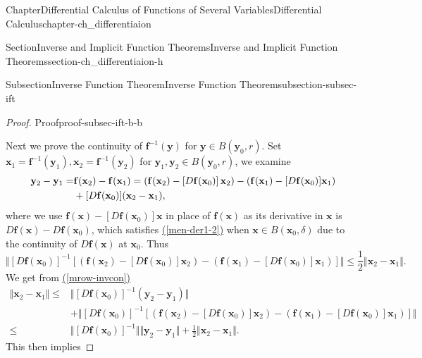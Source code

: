 \documentclass[oneside,10pt,]{book}
\newcommand{\xreffont}{\relax}
\numberwithin{equation}{section}
\newcommand{\bff}{\mathbf{f}}
\newcommand{\by}{\mathbf{y}}
\newcommand{\amp}{&}
\begin{document}
\begin{chapterptx}{Chapter}{Differential Calculus of Functions of Several Variables}{}{Differential Calculus}{}{}{chapter-ch_differentiaion}
\begin{sectionptx}{Section}{Inverse and Implicit Function Theorems}{}{Inverse and Implicit Function Theorems}{}{}{section-ch_differentiaion-h}
\begin{subsectionptx}{Subsection}{Inverse Function Theorem}{}{Inverse Function Theorem}{}{}{subsection-subsec-ift}
\begin{proof}{Proof}{}{proof-subsec-ift-b-b}
\par
Next we prove the continuity of \(\bff^{-1}(\by)\) for \(\by \in B({\mathbf y}_{0}, r)\). Set \({\mathbf x}_{1}=  {\mathbf f}^{-1} ({\mathbf y}_{1}),
{\mathbf x}_{2}=  {\mathbf f}^{-1} ({\mathbf y}_{2})\) for \({\mathbf y}_{1}, {\mathbf y}_{2}\in
B({\mathbf y}_{0}, r)\), we examine%
\begin{align}
{\mathbf y}_{2}- {\mathbf y}_{1}= \amp {\mathbf f}({\mathbf x}_2)- {\mathbf f}({\mathbf x}_1)
=\left( {\mathbf f}({\mathbf x}_2)- \left[D{\mathbf f}({\mathbf x}_{0})\right]{\mathbf x}_2 \right) - 
\left({\mathbf f}({\mathbf x}_1)- [D{\mathbf f}({\mathbf x}_{0})]{\mathbf x}_1\right) \notag\\
\amp + [D{\mathbf f}({\mathbf x}_{0})]({\mathbf x}_2 - {\mathbf x}_1),\label{mrow-invcon}
\end{align}
where we use \({\mathbf f}({\mathbf x})- [D{\mathbf f}({\mathbf x}_{0})]{\mathbf x}\) in place of \({\mathbf f}({\mathbf x})\) as its  derivative in \({\mathbf x}\) is \(D{\mathbf f}({\mathbf x})- D{\mathbf f}({\mathbf x}_{0})\), which satisfies \hyperref[men-der1-2]{({\xreffont\ref{men-der1-2}})} when \({\mathbf x}\in B({\mathbf x}_{0}, \delta)\) due to the continuity of \(D{\mathbf f}({\mathbf x})\) at \({\mathbf x}_{0}\).  Thus%
\begin{equation*}
\Vert \left[D{\mathbf f}({\mathbf x}_{0})\right]^{-1}\left[ 
\left( {\mathbf f}({\mathbf x}_2)- \left[D{\mathbf f}({\mathbf x}_{0})\right]{\mathbf x}_2 \right) - 
\left({\mathbf f}({\mathbf x}_1)- [D{\mathbf f}({\mathbf x}_{0})]{\mathbf x}_1\right) \right] \Vert \le
\frac 12 \Vert {\mathbf x}_2 - {\mathbf x}_1 \Vert\text{.}
\end{equation*}
We get from \hyperref[mrow-invcon]{({\xreffont\ref{mrow-invcon}})}%
\begin{align*}
\Vert {\mathbf x}_2 - {\mathbf x}_1 \Vert 
\le  \amp \Vert  \left[D{\mathbf f}({\mathbf x}_{0})\right]^{-1}\left(
{\mathbf y}_{2}- {\mathbf y}_{1}\right)\Vert\\
\amp + 
\Vert \left[D{\mathbf f}({\mathbf x}_{0})\right]^{-1}\left[ 
\left( {\mathbf f}({\mathbf x}_2)- \left[D{\mathbf f}({\mathbf x}_{0})\right]{\mathbf x}_2 \right) - 
\left({\mathbf f}({\mathbf x}_1)- [D{\mathbf f}({\mathbf x}_{0})]{\mathbf x}_1\right) \right] \Vert\\
\le \amp \Vert  \left[D{\mathbf f}({\mathbf x}_{0})\right]^{-1}\Vert \Vert
{\mathbf y}_{2}- {\mathbf y}_{1}\Vert+ \frac 12 \Vert {\mathbf x}_2 - {\mathbf x}_1 \Vert.
\end{align*}
This then implies%

\end{proof}
\end{subsectionptx}
\end{sectionptx}
\end{chapterptx}
\end{document}

